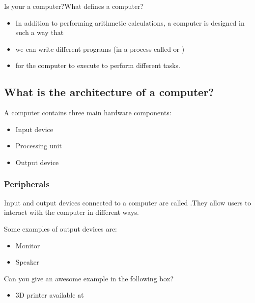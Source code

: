 \documentclass[letterpaper,10pt,english]{sphinxmanual}
\begin{document}
Is your  a computer?What defines a computer?
\begin{itemize}
\item {} 
In addition to performing arithmetic calculations, a computer is designed in such a way that

\item {} 
we can write different programs (in a process called  or )

\item {} 
for the computer to execute to perform different tasks.

\end{itemize}


\subsection{What is the architecture of a computer?}
\label{\detokenize{Lecture1/Introduction to Computer Programming:what-is-the-architecture-of-a-computer}}
A computer contains three main hardware components:
\begin{itemize}
\item {} 
Input device

\item {} 
Processing unit

\item {} 
Output device

\end{itemize}


\subsubsection{Peripherals}
\label{\detokenize{Lecture1/Introduction to Computer Programming:peripherals}}


Input and output devices connected to a computer are called .They allow users to interact with the computer in different ways.

 Some examples of output devices are:
\begin{itemize}
\item {} 
Monitor

\item {} 
Speaker

\end{itemize}

Can you give an awesome example in the following box?
\begin{itemize}
\item {} 
3D printer available at 

\end{itemize}
\end{document}
